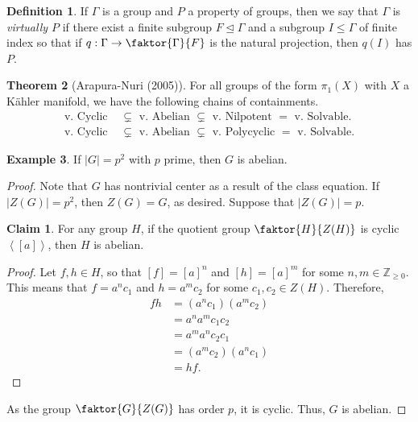 \documentclass[10pt,letterpaper,cm]{nupset}
\theoremstyle{definition}
\newtheorem{definition}{Definition}[subsection]
\newtheorem{exmp}[definition]{Example}
\theoremstyle{theorem}
\newtheorem{theorem}[definition]{Theorem}
\newtheorem*{claim}{Claim}
\theoremstyle{remark}
\newcommand{\Z}{\mathbb Z}
\newcommand{\1}{\mathbf{1}}
\newcommand{\0}{\vec 0}
\begin{document}
\begin{definition}
If $\Gamma$ is a group and $P$ a property of groups, then we say that $\Gamma$ is \textit{virtually $P$} if there exist a finite subgroup $F \unlhd \Gamma$ and a subgroup $I \leq \Gamma$ of finite index so that if $q: \Gamma \to \faktor{\Gamma}{F}$ is the natural projection, then $q(I)$ has $P$. 
\end{definition}

\begin{theorem}[Arapura-Nuri (2005)]
For all groups of the form $\pi_1(X)$ with $X$ a K\"ahler manifold, we have the following chains of containments.
\begin{align*}
 \text{v. Cyclic } &\subsetneq \text{ v. Abelian } \subsetneq \text{ v. Nilpotent } = \text{ v. Solvable}.
\\ \text{v. Cyclic } &  \subsetneq \text{ v. Abelian } \subsetneq \text{ v. Polycyclic } = \text{ v. Solvable}.
\end{align*}
\end{theorem}

\bigskip

\begin{exmp}
If $\left\lvert{G}\right\rvert =p^2$ with $p$ prime, then $G$ is abelian.
\end{exmp}
\begin{proof}
Note that $G$ has nontrivial center as a result of the class equation. If $\left\lvert{Z(G)}\right\rvert =p^2$, then $Z(G) = G$, as desired. Suppose that $\left\lvert{Z(G)}\right\rvert =p$. 
\begin{claim}
For any group $H$, if the quotient group $\faktor{H}{Z(H)}$ is cyclic $\left\langle \left[a\right]\right\rangle$, then $H$ is abelian. 
\end{claim}
\begin{proof}
Let $f,h\in H$, so that $\left[f\right] = \left[a\right]^n$ and $\left[h\right] = \left[a\right]^m$ for some $n,m\in \Z_{\geq 0}$. This means that $f = a^nc_1$ and $h = a^mc_2$ for some $c_1, c_2\in Z(H)$. Therefore,
\begin{align*}
fh & = \left( a^nc_1\right)\left(a^mc_2\right)
\\ & = a^na^mc_1c_2
\\ & = a^ma^nc_2c_1
\\ & = \left(a^mc_2\right)\left(a^nc_1\right)
\\ & = hf.
\end{align*}
\end{proof}
As the group  $\faktor{G}{Z(G)}$ has order $p$, it is cyclic. Thus, $G$ is abelian.
\end{proof}
\end{document}
